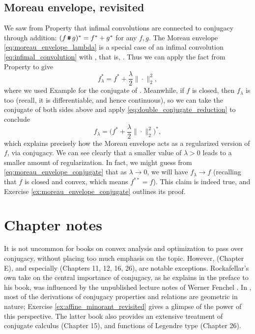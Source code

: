 \subsection{Moreau envelope, revisited}
\label{sec:moreau_revisited}

We saw from Property  that infimal
convolutions are connected to conjugacy through addition: $(f \operatorname{\texttt{\#}} g)^* =
f^* + g^*$ for any $f,g$. The Moreau envelope \eqref{eq:moreau_envelope_lambda}
is a special case of an infimal convolution \eqref{eq:infimal_convolution} with
, that is, . Thus we can apply the fact from
Property  to give 
\[
f_\lambda^* = f^* + \frac{\lambda}{2} \|\cdot\|_2^2,
\]
where we used Example  for the conjugate of
. Meanwhile, if $f$ is closed, then
$f_\lambda$ is too (recall, it is differentiable, and hence continuous), so we
can take the conjugate of both sides above and apply
\eqref{eq:double_conjugate_reduction} to conclude   
\begin{equation}
\label{eq:moreau_envelope_conjugate}
f_\lambda = \bigg( f^* + \frac{\lambda}{2} \|\cdot\|_2^2 \bigg)^*,
\end{equation}
which explains precisely how the Moreau envelope acts as a regularized version 
of $f$, via conjugacy. We can see clearly that a smaller value of $\lambda>0$
leads to a smaller amount of regularization. In fact, we might guess from 
\eqref{eq:moreau_envelope_conjugate} that as $\lambda \to 0$, we will have  
$f_\lambda\to f$ (recalling that $f$ is closed and convex, which means $f^{**} =
f$). This claim is indeed true, and Exercise \ref{ex:moreau_envelope_conjugate}
outlines its proof.    

\SkipTocEntry\section*{Chapter notes}

It is not uncommon for books on convex analysis and optimization to pass over
conjugacy, without placing too much emphasis on the topic. However,
\cite{hiriartUrruty2001fundamentals} (Chapter E), and especially
\cite{rockafellar1970convex} (Chapters 11, 12, 16, 26), are notable
exceptions. Rockafellar's own take on the central importance of conjugacy, as he
explains in the preface to his book, was influenced by the unpublished lecture
notes of Werner Fenchel \cite{fenchel1951convex}. In
\cite{rockafellar1970convex}, most of the derivations of conjugacy properties
and relations are geometric in nature; Exercise
\ref{ex:affine_minorant_revisited} gives a glimpse of the power of this
perspective. The latter book also provides an extensive treatment of conjugate
calculus (Chapter 15), and functions of Legendre type (Chapter 26).


